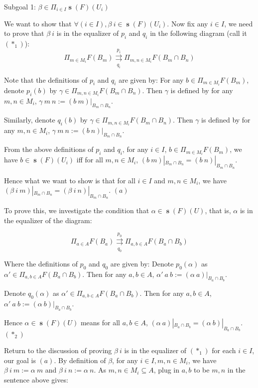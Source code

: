 \documentclass[a4paper]{article}
\DeclareMathOperator{\s}{\mathbf s}
\begin{document}
Subgoal 1: $\beta\in \Pi_{i\in I}\s(F)(U_i)$\newline

We want to show that $\forall (i\in I),\beta \ i\in \s(F)(U_i)$. Now fix any $i\in I$, we need to prove that $\beta \ i$ is in the equalizer of $p_i$ and $q_i$ in the following diagram (call it $(*_1)$):
\[\Pi_{m\in M_i}F(B_m)\overset{p_i}{\underset{q_i}\rightrightarrows}\Pi_{m,n\in M_i}F(B_m\cap B_n)\]

Note that the definitions of $p_i$ and $q_i$ are given by:\newline
For any $b\in \Pi_{m\in M_i}F(B_m)$, denote $p_i(b)$ by $\gamma\in \Pi_{m,n\in M_i}F(B_m\cap B_n)$. Then $\gamma$ is defined by for any $m,n\in M_i$, $\gamma \ m \ n := (b \ m)|_{B_m\cap B_n}$.

Similarly, denote $q_i(b)$ by $\gamma\in \Pi_{m,n\in M_i}F(B_m\cap B_n)$. Then $\gamma$ is defined by for any $m,n\in M_i$, $\gamma \ m \ n := (b \ n)|_{B_m\cap B_n}$.

From the above definitions of $p_i$ and $q_i$, for any $i\in I$, $b \in \Pi_{m\in M_i}F(B_m)$, we have $b\in \s(F)(U_i)$ iff for all $m,n\in M_i$, $(b \ m)|_{B_m\cap B_n}=(b \ n)|_{B_m\cap B_n}$.

Hence what we want to show is that for all $i\in I$ and $m,n\in M_i$, we have $(\beta \ i \ m)|_{B_m\cap B_n}=(\beta \ i \ n)|_{B_m\cap B_n}$. $(a)$

To prove this, we investigate the condition that $\alpha\in \s(F)(U)$, that is, $\alpha$ is in the equalizer of the diagram:

\[\Pi_{a\in A}F(B_a)\overset{p_0}{\underset{q_0}{\rightrightarrows}}\Pi_{a,b\in A} F(B_a\cap B_b)\]

Where the definitions of $p_0$ and $q_0$ are given by:\newline
Denote $p_0(\alpha)$ as $\alpha'\in \Pi_{a,b\in A}F(B_a\cap B_b)$. Then for any $a,b\in A$, $\alpha' \ a \ b:= (\alpha \ a)|_{B_a\cap B_b}$. 

Denote $q_0(\alpha)$ as $\alpha'\in \Pi_{a,b\in A}F(B_a\cap B_b)$. Then for any $a,b\in A$, $\alpha' \ a \ b:= (\alpha \ b)|_{B_a\cap B_b}$. 

Hence $\alpha\in \s(F)(U)$ means for all $a,b\in A$, $(\alpha \ a)|_{B_a\cap B_b}=(\alpha \ b)|_{B_a\cap B_b}$. $(*_2)$

Return to the discussion of proving $\beta \ i$ is in the equalizer of $(*_1)$ for each $i\in I$, our goal is $(a)$. By definition of $\beta$, for any $i\in I, m,n\in M_i$, we have $\beta\ i \ m := \alpha \ m$ and $\beta \ i \ n := \alpha\ n$. As $m,n\in M_i\subseteq A$, plug in $a,b$ to be $m,n$ in the sentence above gives:
\end{document}
